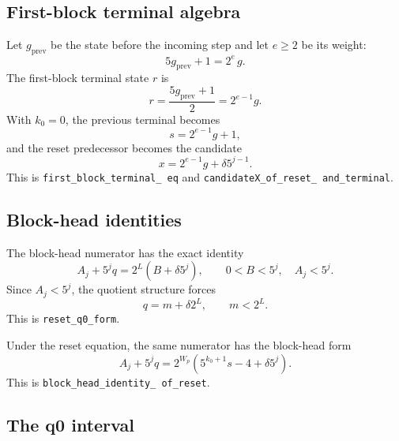 \subsection{First-block terminal algebra}

Let $g_{\mathrm{prev}}$ be the state before the incoming step and let
$e\ge2$ be its weight:
\begin{equation*}
  5g_{\mathrm{prev}}+1=2^e\,g.
\end{equation*}
The first-block terminal state $r$ is
\begin{equation*}
  r=\frac{5g_{\mathrm{prev}}+1}{2}=2^{e-1}g.
\end{equation*}
With $k_0=0$, the previous terminal becomes
\begin{equation*}
  s=2^{e-1}g+1,
\end{equation*}
and the reset predecessor becomes the candidate
\begin{equation*}
  x=2^{e-1}g+\delta5^{j-1}.
\end{equation*}
This is \texttt{first\_\allowbreak block\_\allowbreak terminal\_\allowbreak
eq} and \texttt{candidateX\_\allowbreak of\_\allowbreak reset\_\allowbreak
and\_\allowbreak terminal}.

\subsection{Block-head identities}

The block-head numerator has the exact identity
\begin{equation*}
  A_j+5^jq=2^L\left(B+\delta5^j\right),
\qquad 0<B<5^j,\quad A_j<5^j.
\end{equation*}
Since $A_j<5^j$, the quotient structure forces
\begin{equation*}
  q=m+\delta2^L,\qquad m<2^L.
\end{equation*}
This is \texttt{reset\_\allowbreak q0\_\allowbreak form}.

Under the reset equation, the same numerator has the block-head form
\begin{equation*}
  A_j+5^jq
    =2^{W_p}\left(5^{k_0+1}s-4+\delta5^j\right).
\end{equation*}
This is \texttt{block\_\allowbreak head\_\allowbreak identity\_\allowbreak
of\_\allowbreak reset}.

\subsection{The q0 interval}

